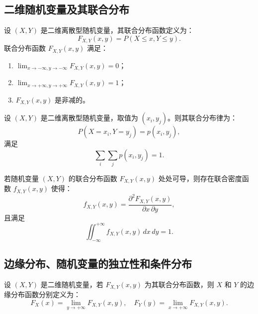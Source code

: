 \documentclass[UTF8]{ctexart}
\begin{document}
	\subsection{二维随机变量及其联合分布}
	
	\begin{tcolorbox}[colback=definition!5!white, colframe=definition!75!black, title=二维离散型随机变量及联合分布函数]
		设 $(X, Y)$ 是二维离散型随机变量，其联合分布函数定义为：
		\[
		F_{X,Y}(x, y) = P(X \leq x, Y \leq y).
		\]
		联合分布函数 $F_{X,Y}(x, y)$ 满足：
		\begin{enumerate}
			\item $\lim_{x \to -\infty, y \to -\infty} F_{X,Y}(x, y) = 0$；
			\item $\lim_{x \to +\infty, y \to +\infty} F_{X,Y}(x, y) = 1$；
			\item $F_{X,Y}(x, y)$ 是非减的。
		\end{enumerate}
	\end{tcolorbox}
	
	\begin{tcolorbox}[colback=definition!5!white, colframe=definition!75!black, title=二维离散型随机变量的联合分布律]
		设 $(X, Y)$ 是二维离散型随机变量，取值为 $(x_i, y_j)$。则其联合分布律为：
		\[
		P(X = x_i, Y = y_j) = p(x_i, y_j),
		\]
		满足
		\[
		\sum_{i} \sum_{j} p(x_i, y_j) = 1.
		\]
	\end{tcolorbox}
	
	\begin{tcolorbox}[colback=definition!5!white, colframe=definition!75!black, title=二维连续型随机变量及其联合密度函数]
		若随机变量 $(X, Y)$ 的联合分布函数 $F_{X,Y}(x, y)$ 处处可导，则存在联合密度函数 $f_{X,Y}(x, y)$ 使得：
		\[
		f_{X,Y}(x, y) = \frac{\partial^2 F_{X,Y}(x, y)}{\partial x \, \partial y},
		\]
		且满足
		\[
		\iint_{-\infty}^{+\infty} f_{X,Y}(x, y) \, dx \, dy = 1.
		\]
	\end{tcolorbox}
	
	\subsection{边缘分布、随机变量的独立性和条件分布}
	
	\begin{tcolorbox}[colback=definition!5!white, colframe=definition!75!black, title=边缘分布函数]
		设 $(X, Y)$ 是二维随机变量，若 $F_{X,Y}(x, y)$ 为其联合分布函数，则 $X$ 和 $Y$ 的边缘分布函数分别定义为：
		\[
		F_X(x) = \lim_{y \to +\infty} F_{X,Y}(x, y), \quad F_Y(y) = \lim_{x \to +\infty} F_{X,Y}(x, y).
		\]
	\end{tcolorbox}
	
\end{document}
